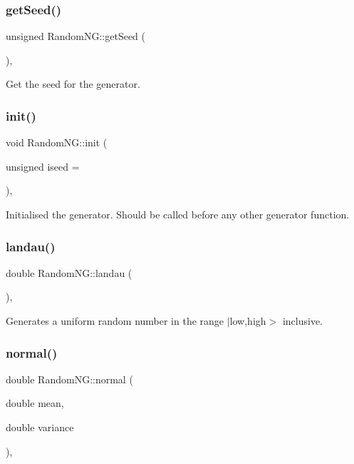 \subsubsection{\texorpdfstring{get\+Seed()}{getSeed()}}
{\footnotesize\ttfamily unsigned Random\+N\+G\+::get\+Seed (\begin{DoxyParamCaption}{ }\end{DoxyParamCaption})\hspace{0.3cm}{\ttfamily [inline]}, {\ttfamily [static]}}

Get the seed for the generator. \mbox{\label{classRandomNG_acaabcd3fa0e8e8fc73d4065cecbefd8a}} 
\subsubsection{\texorpdfstring{init()}{init()}}
{\footnotesize\ttfamily void Random\+N\+G\+::init (\begin{DoxyParamCaption}\item[{unsigned}]{iseed = {} }\end{DoxyParamCaption})\hspace{0.3cm}{\ttfamily [inline]}, {\ttfamily [static]}}

Initialised the generator. Should be called before any other generator function. \mbox{\label{classRandomNG_acc4327088b8d7b96d9f6718fa584aa8b}} 
\subsubsection{\texorpdfstring{landau()}{landau()}}
{\footnotesize\ttfamily double Random\+N\+G\+::landau (\begin{DoxyParamCaption}{ }\end{DoxyParamCaption})\hspace{0.3cm}{\ttfamily [inline]}, {\ttfamily [static]}}

Generates a uniform random number in the range $\vert$low,high$>$ inclusive. \mbox{\label{classRandomNG_a94cd0fbe15525846e3d4646f2934eee9}} 
\subsubsection{\texorpdfstring{normal()}{normal()}\hspace{0.1cm}{\footnotesize\ttfamily [1/2]}}
{\footnotesize\ttfamily double Random\+N\+G\+::normal (\begin{DoxyParamCaption}\item[{double}]{mean,  }\item[{double}]{variance }\end{DoxyParamCaption})\hspace{0.3cm}{\ttfamily [inline]}, {\ttfamily [static]}}


